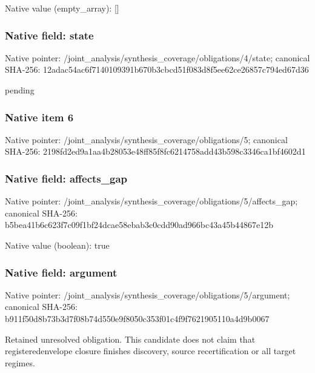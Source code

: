 \documentclass[10pt,a4paper]{article}
\begin{document}
Native value (empty\_array): []



\subsubsection{Native field: state}


Native pointer: /joint\_analysis/synthesi\allowbreak{}s\_coverage/obligations/4\allowbreak{}/state; canonical SHA-256: 12adac54ac6f7140109391b6\allowbreak{}70b3cbcd51f083d8f5ee62ce\allowbreak{}26857c794ed67d36


pending


\subsubsection{Native item 6}


Native pointer: /joint\_analysis/synthesi\allowbreak{}s\_coverage/obligations/5; canonical SHA-256: 2198fd2ed9a1aa4b28053e48\allowbreak{}ff85f8fc6214758add43b598\allowbreak{}c3346ca1bf4602d1



\subsubsection{Native field: affects\_gap}


Native pointer: /joint\_analysis/synthesi\allowbreak{}s\_coverage/obligations/5\allowbreak{}/affects\_gap; canonical SHA-256: b5bea41b6c623f7c09f1bf24\allowbreak{}dcae58ebab3c0cdd90ad966b\allowbreak{}c43a45b44867e12b



Native value (boolean): true



\subsubsection{Native field: argument}


Native pointer: /joint\_analysis/synthesi\allowbreak{}s\_coverage/obligations/5\allowbreak{}/argument; canonical SHA-256: b911f50d8b73b3d7f08b74d5\allowbreak{}50e9f8050c353f01c4f9f762\allowbreak{}1905110a4d9b0067


Retained unresolved obligation. This candidate does not claim that registeredenvelope closure finishes discovery, source recertification or all target regimes.
\end{document}
